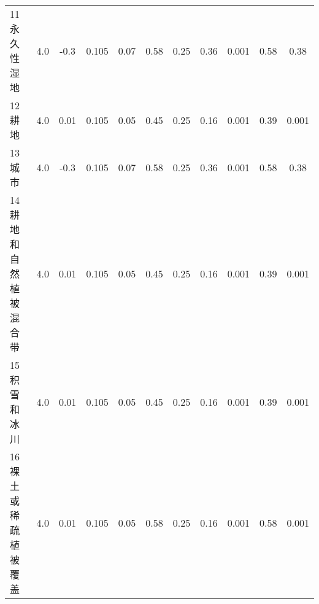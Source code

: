 \begin{sidewaystable}[]
\begin{tabular}{@{}lcccccccccc@{}}
            11 永久性湿地      & 4.0         & -0.3         & 0.105          & 0.07          & 0.58          & 0.25          & 0.36          & 0.001          & 0.58           & 0.38 \\
            12 耕地         & 4.0          & 0.01          & 0.105          & 0.05          & 0.45          & 0.25          & 0.16          & 0.001          & 0.39          & 0.001         \\
            13 城市         & 4.0          & -0.3          & 0.105          & 0.07          & 0.58          & 0.25          & 0.36          & 0.001          & 0.58          & 0.38          \\
            14 耕地和自然植被混合带 & 4.0          & 0.01          & 0.105          & 0.05          & 0.45          & 0.25          & 0.16          & 0.001          & 0.39          & 0.001         \\
            15 积雪和冰川      & 4.0          & 0.01          & 0.105          & 0.05          & 0.45          & 0.25          & 0.16          & 0.001          & 0.39          & 0.001         \\
            16 裸土或稀疏植被覆盖  & 4.0          & 0.01          & 0.105          & 0.05          & 0.58          & 0.25          & 0.16          & 0.001          & 0.58          & 0.001         \\\bottomrule
        \end{tabular}
    \end{sidewaystable}
    


